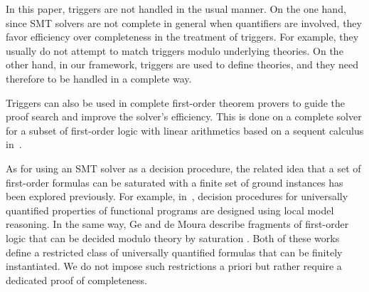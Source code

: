 \documentclass[]{easychair}
\begin{document}
In this paper, triggers are not handled in the usual manner. On the one
hand, since SMT solvers are not complete in general when quantifiers are
involved, they favor efficiency over completeness in the treatment of
triggers. For example, they usually do not attempt to match triggers modulo
underlying theories. On the other hand, in our framework, triggers are used
to define theories, and they need therefore to be handled in a complete way.

Triggers can also be used in complete first-order theorem provers to guide
the proof search and improve the solver's efficiency. This is done on a
complete solver for a subset of first-order logic with linear arithmetics
based on a sequent calculus in~\cite{rummer2012matching}.

As for using an SMT solver as a decision procedure, the related idea that a
set of first-order formulas can be saturated with
a finite set of ground instances has been explored previously.
For example, in~\cite{kuncak}, decision procedures for
universally quantified properties of functional programs are designed
using local model reasoning.
In the same way, Ge and de Moura describe
fragments of first-order logic that can be decided modulo theory
by saturation \cite{MBQI}. Both of these works define a restricted class of
universally quantified formulas that can be finitely instantiated. We do not
impose such restrictions a priori but rather require a dedicated proof of
completeness.


%
\end{document}
